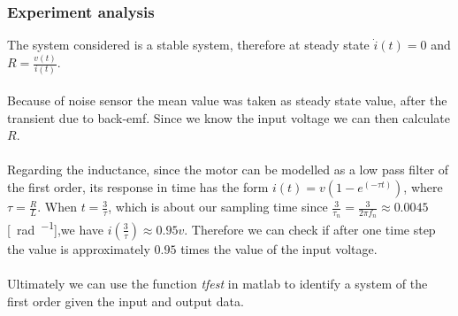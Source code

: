 \subsubsection{Experiment analysis}
The system considered is a stable system, therefore at steady state $\dot{i}(t) = 0$ and $R = \frac{v(t)}{i(t)}$. \\ \\
Because of noise sensor the mean value was taken as steady state value, after the transient due to back-emf. Since we know the input voltage we can then calculate $R$. \\ \\
Regarding the inductance, since the motor can be modelled as a low pass filter of the first order, its response in time has the form $i(t) = v (1-e^(-\tau t))$, where $\tau = \frac{R}{L}$.  When $t=\frac{3}{\tau}$, which is about our sampling time since $\frac{3}{\tau_n}=\frac{3}{2\pi f_n} \approx 0.0045$ [\SI{}{\radian \per \sec}],we have $i(\frac{3}{\tau}) \approx 0.95v$. Therefore we can check if after one time step the value is approximately $0.95$ times the value of the input voltage. \\ \\ 
Ultimately we can use the function \emph{tfest} in matlab to identify a system of the first order given the input and output data.
